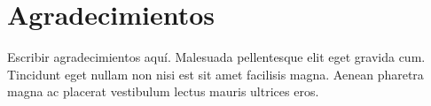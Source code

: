 
\newpage
\clearpage{\pagestyle{empty}\cleardoublepage}
\newpage

\chapter*{\centering \large Agradecimientos}

Escribir agradecimientos aquí. Malesuada pellentesque elit eget gravida cum. Tincidunt eget nullam non nisi est sit amet facilisis magna. Aenean pharetra magna ac placerat vestibulum lectus mauris ultrices eros. 
